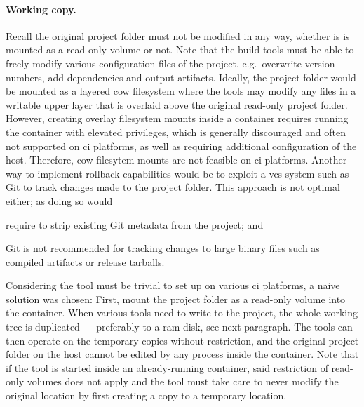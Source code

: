 \paragraph{Working copy.} Recall the original project folder must not be modified in any way, whether is is mounted as a read-only volume or not. Note that the build tools must be able to freely modify various configuration files of the project, e.g.~overwrite version numbers, add dependencies and output artifacts.
Ideally, the project folder would be mounted as a layered \acrfull{cow} filesystem where the tools may modify any files in a writable upper layer that is overlaid above the original read-only project folder. However, creating overlay filesystem mounts inside a container requires running the container with elevated privileges, which is generally discouraged and often not supported on \acrshort{ci} platforms, as well as requiring additional configuration of the host. Therefore, \acrshort{cow} filesytem mounts are not feasible on \acrshort{ci} platforms. Another way to implement rollback capabilities would be to exploit a \acrfull{vcs} system such as Git to track changes made to the project folder. This approach is not optimal either; as doing so would \begin{enumerate*}[label=(\roman*)]
  \item require to strip existing Git metadata from the project; and
  \item Git is not recommended for tracking changes to large binary files such as compiled artifacts or release tarballs.
\end{enumerate*}

Considering the tool must be trivial to set up on various \acrshort{ci} platforms, a naive solution was chosen: First, mount the project folder as a read-only volume into the container. When various tools need to write to the project, the whole working tree is duplicated --- preferably to a \acrshort{ram} disk, see next paragraph. The tools can then operate on the temporary copies without restriction, and the original project folder on the host cannot be edited by any process inside the container. Note that if the tool is started inside an already-running container, said restriction of read-only volumes does not apply and the tool must take care to never modify the original location by first creating a copy to a temporary location.

